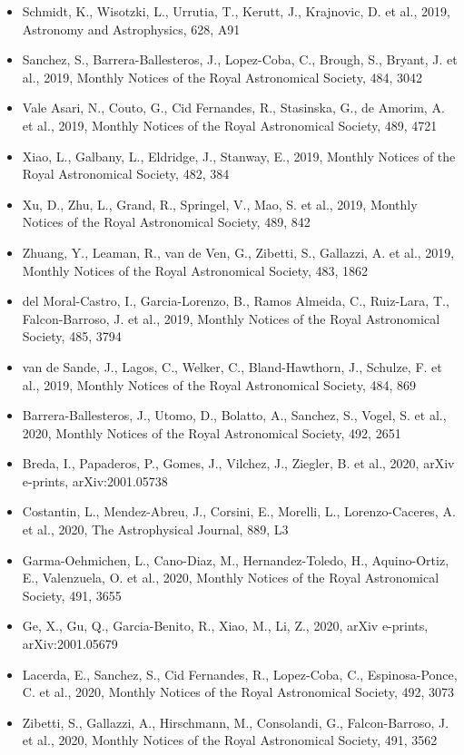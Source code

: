 \documentclass{letter}
\begin{document}
\begin{enumerate}
\begin{itemize}
\item Schmidt, K., Wisotzki, L., Urrutia, T., Kerutt, J., Krajnovic, D. et al., 2019, Astronomy and Astrophysics, 628, A91
\item Sanchez, S., Barrera-Ballesteros, J., Lopez-Coba, C., Brough, S., Bryant, J. et al., 2019, Monthly Notices of the Royal Astronomical Society, 484, 3042
\item Vale Asari, N., Couto, G., Cid Fernandes, R., Stasinska, G., de Amorim, A. et al., 2019, Monthly Notices of the Royal Astronomical Society, 489, 4721
\item Xiao, L., Galbany, L., Eldridge, J., Stanway, E., 2019, Monthly Notices of the Royal Astronomical Society, 482, 384
\item Xu, D., Zhu, L., Grand, R., Springel, V., Mao, S. et al., 2019, Monthly Notices of the Royal Astronomical Society, 489, 842
\item Zhuang, Y., Leaman, R., van de Ven, G., Zibetti, S., Gallazzi, A. et al., 2019, Monthly Notices of the Royal Astronomical Society, 483, 1862
\item del Moral-Castro, I., Garcia-Lorenzo, B., Ramos Almeida, C., Ruiz-Lara, T., Falcon-Barroso, J. et al., 2019, Monthly Notices of the Royal Astronomical Society, 485, 3794
\item van de Sande, J., Lagos, C., Welker, C., Bland-Hawthorn, J., Schulze, F. et al., 2019, Monthly Notices of the Royal Astronomical Society, 484, 869
\item Barrera-Ballesteros, J., Utomo, D., Bolatto, A., Sanchez, S., Vogel, S. et al., 2020, Monthly Notices of the Royal Astronomical Society, 492, 2651
\item Breda, I., Papaderos, P., Gomes, J., Vilchez, J., Ziegler, B. et al., 2020, arXiv e-prints, arXiv:2001.05738
\item Costantin, L., Mendez-Abreu, J., Corsini, E., Morelli, L., Lorenzo-Caceres, A. et al., 2020, The Astrophysical Journal, 889, L3
\item Garma-Oehmichen, L., Cano-Diaz, M., Hernandez-Toledo, H., Aquino-Ortiz, E., Valenzuela, O. et al., 2020, Monthly Notices of the Royal Astronomical Society, 491, 3655
\item Ge, X., Gu, Q., Garcia-Benito, R., Xiao, M., Li, Z., 2020, arXiv e-prints, arXiv:2001.05679
\item Lacerda, E., Sanchez, S., Cid Fernandes, R., Lopez-Coba, C., Espinosa-Ponce, C. et al., 2020, Monthly Notices of the Royal Astronomical Society, 492, 3073
\item Zibetti, S., Gallazzi, A., Hirschmann, M., Consolandi, G., Falcon-Barroso, J. et al., 2020, Monthly Notices of the Royal Astronomical Society, 491, 3562

\end{itemize}
\end{enumerate}
\end{document}
